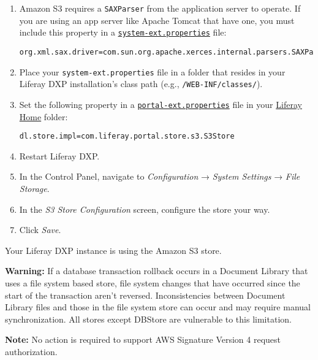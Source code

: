 \begin{enumerate}
\def\labelenumi{\arabic{enumi}.}
\item
  Amazon S3 requires a \texttt{SAXParser} from the application server to
  operate. If you are using an app server like Apache Tomcat that have
  one, you must include this property in a
  \href{/docs/7-2/deploy/-/knowledge_base/d/system-properties}{\texttt{system-ext.properties}}
  file:

\begin{verbatim}
org.xml.sax.driver=com.sun.org.apache.xerces.internal.parsers.SAXParser
\end{verbatim}
\item
  Place your \texttt{system-ext.properties} file in a folder that
  resides in your Liferay DXP installation's class path (e.g.,
  \texttt{/WEB-INF/classes/}).
\item
  Set the following property in a
  \href{/docs/7-2/deploy/-/knowledge_base/d/portal-properties}{\texttt{portal-ext.properties}}
  file in your
  \href{/docs/7-2/deploy/-/knowledge_base/d/liferay-home}{Liferay Home}
  folder:

\begin{verbatim}
dl.store.impl=com.liferay.portal.store.s3.S3Store
\end{verbatim}
\item
  Restart Liferay DXP.
\item
  In the Control Panel, navigate to \emph{Configuration} → \emph{System
  Settings} → \emph{File Storage}.
\item
  In the \emph{S3 Store Configuration} screen, configure the store your
  way.
\item
  Click \emph{Save}.
\end{enumerate}

Your Liferay DXP instance is using the Amazon S3 store.

\noindent\hrulefill

\textbf{Warning:} If a database transaction rollback occurs in a
Document Library that uses a file system based store, file system
changes that have occurred since the start of the transaction aren't
reversed. Inconsistencies between Document Library files and those in
the file system store can occur and may require manual synchronization.
All stores except DBStore are vulnerable to this limitation.

\noindent\hrulefill

\noindent\hrulefill

\textbf{Note:} No action is required to support AWS Signature Version 4
request authorization.

